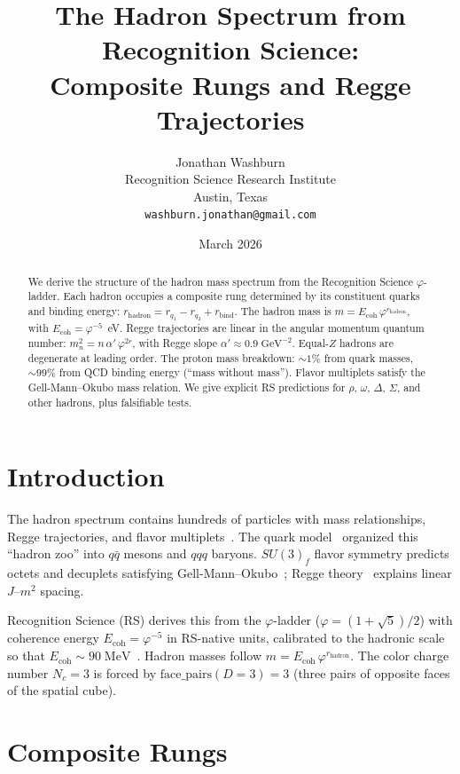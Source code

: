 \documentclass[12pt,a4paper]{article}
\title{The Hadron Spectrum from Recognition Science:\\
Composite Rungs and Regge Trajectories}
\author{Jonathan Washburn\\
Recognition Science Research Institute\\
Austin, Texas\\
\texttt{washburn.jonathan@gmail.com}}
\date{March 2026}
\theoremstyle{definition}
\theoremstyle{remark}
\begin{document}
\maketitle

\begin{abstract}
We derive the structure of the hadron mass spectrum from the
Recognition Science $\varphi$-ladder.  Each hadron occupies a
composite rung determined by its constituent quarks and binding
energy: $r_{\mathrm{hadron}} = r_{q_1} - r_{q_2} + r_{\mathrm{bind}}$.
The hadron mass is $m = E_{\mathrm{coh}}\,\varphi^{r_{\mathrm{hadron}}}$,
with $E_{\mathrm{coh}} = \varphi^{-5}$~eV.  Regge trajectories are
linear in the angular momentum quantum number:
$m_n^2 = n\,\alpha'\,\varphi^{2r}$, with Regge slope
$\alpha' \approx 0.9\;\mathrm{GeV}^{-2}$.  Equal-$Z$ hadrons are
degenerate at leading order.  The proton mass breakdown: $\sim 1\%$
from quark masses, $\sim 99\%$ from QCD binding energy (``mass
without mass'').  Flavor multiplets satisfy the Gell-Mann--Okubo mass
relation.  We give explicit RS predictions for $\rho$, $\omega$,
$\Delta$, $\Sigma$, and other hadrons, plus falsifiable tests.
\end{abstract}

\section{Introduction}\label{sec:intro}

The hadron spectrum contains hundreds of particles with mass
relationships, Regge trajectories, and flavor multiplets~\cite{PDG}.
The quark model~\cite{GellMann1964} organized this ``hadron zoo'' into
$q\bar{q}$ mesons and $qqq$ baryons.  $SU(3)_f$ flavor symmetry
predicts octets and decuplets satisfying Gell-Mann--Okubo~\cite{Okubo1962};
Regge theory~\cite{Regge1959} explains linear $J$--$m^2$ spacing.

Recognition Science (RS) derives this from the $\varphi$-ladder
($\varphi = (1+\sqrt{5})/2$) with coherence energy
$E_{\mathrm{coh}} = \varphi^{-5}$ in RS-native units,
calibrated to the hadronic scale so that
$E_{\mathrm{coh}} \sim 90\;\mathrm{MeV}$~\cite{RS_Axioms}.
Hadron masses follow $m = E_{\mathrm{coh}}\,\varphi^{r_{\mathrm{hadron}}}$.
The color charge number $N_c = 3$ is forced by
$\mathrm{face\_pairs}(D{=}3) = 3$ (three pairs of opposite faces
of the spatial cube).

\section{Composite Rungs}\label{sec:composite}
\end{document}
